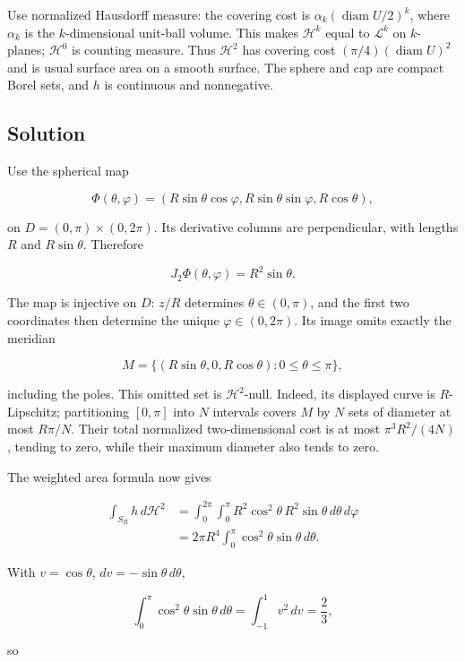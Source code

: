 \documentclass[
  11pt,
]{article}
\begin{document}
Use normalized Hausdorff measure: the covering cost is
\(\alpha_k(\operatorname{diam}U/2)^k\), where \(\alpha_k\) is the
\(k\)-dimensional unit-ball volume. This makes \(\mathcal H^k\) equal to
\(\mathcal L^k\) on \(k\)-planes; \(\mathcal H^0\) is counting measure.
Thus \(\mathcal H^2\) has covering cost
\((\pi/4)(\operatorname{diam}U)^2\) and is usual surface area on a
smooth surface. The sphere and cap are compact Borel sets, and \(h\) is
continuous and nonnegative.

\subsection{Solution}\label{solution-9}

Use the spherical map

\[
\Phi(\theta,\varphi)
=(R\sin\theta\cos\varphi,R\sin\theta\sin\varphi,R\cos\theta),
\]

on \(D=(0,\pi)\times(0,2\pi)\). Its derivative columns are
perpendicular, with lengths \(R\) and \(R\sin\theta\). Therefore

\[
J_2\Phi(\theta,\varphi)=R^2\sin\theta.
\]

The map is injective on \(D\): \(z/R\) determines \(\theta\in(0,\pi)\),
and the first two coordinates then determine the unique
\(\varphi\in(0,2\pi)\). Its image omits exactly the meridian

\[
M=\{(R\sin\theta,0,R\cos\theta):0\leq\theta\leq\pi\},
\]

including the poles. This omitted set is \(\mathcal H^2\)-null. Indeed,
its displayed curve is \(R\)-Lipschitz; partitioning \([0,\pi]\) into
\(N\) intervals covers \(M\) by \(N\) sets of diameter at most
\(R\pi/N\). Their total normalized two-dimensional cost is at most
\(\pi^3R^2/(4N)\), tending to zero, while their maximum diameter also
tends to zero.

The weighted area formula now gives

\[
\begin{aligned}
\int_{S_R}h\,d\mathcal H^2
&=\int_0^{2\pi}\int_0^\pi
R^2\cos^2\theta\,R^2\sin\theta\,d\theta\,d\varphi\\
&=2\pi R^4\int_0^\pi\cos^2\theta\sin\theta\,d\theta.
\end{aligned}
\]

With \(v=\cos\theta\), \(dv=-\sin\theta\,d\theta\),

\[
\int_0^\pi\cos^2\theta\sin\theta\,d\theta
=\int_{-1}^1v^2\,dv=\frac23,
\]

so
\end{document}
